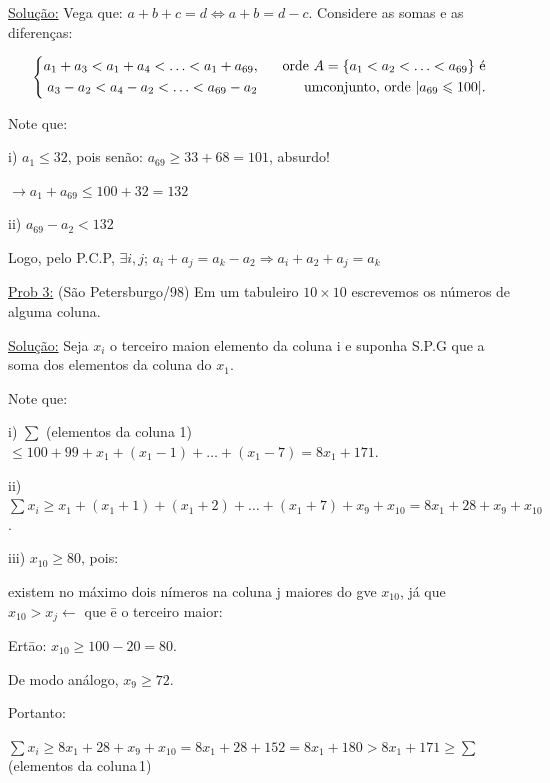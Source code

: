 \documentclass[a4paper,12pt]{article}
\renewcommand{\leq}{\ensuremath{\leqslant}}
\renewcommand{\geq}{\ensuremath{\geqslant}}
\theoremstyle{plain} %
\theoremstyle{definition} %
\theoremstyle{remark} %
\begin{document}
	\begin{framed}
		
		\underline{Solu\c{c}\~ao:} Vega que: $a+b+c=d \Leftrightarrow a+b=d-c$. Considere as somas e as diferen\c{c}as:
		
		\[
		\left\{
		\begin{aligned}
			a_1+a_3<a_1+a_4<\dotso<a_1+a_{69}, \text{\hspace{3ex} orde } A=\{a_1<a_2<\dotso<a_{69}\} \text{ \'e} \\
			a_3-a_2<a_4-a_2<\dotso<a_{69}-a_2 \text{\hspace{7ex} umconjunto, orde } |a_{69}\leq 100|.\\
		\end{aligned}
		\right.
		\]
		
		Note que:
		
		i) $a_1\leq 32$, pois sen\~ao: $a_{69}\geq 33+68=101$, absurdo!
		
		$\rightarrow a_1+a_{69}\leq 100+32=132$
		
		ii) $a_{69}-a_2<132$
		
		Logo, pelo P.C.P, $\exists i,j$; $a_i+a_j=a_k-a_2\Rightarrow a_i+a_2+a_j=a_k$ \tiny\textblock
		
	\end{framed}
	\normalsize
	
	\vspace{2ex}\underline{Prob 3:} (S\~ao Petersburgo/98) Em um tabuleiro $10\times 10$ escrevemos os n\'umeros de alguma coluna.
	
	\begin{framed}
		\underline{Solu\c{c}\~ao:} Seja $x_i$ o terceiro maion elemento da coluna i e suponha S.P.G que a soma dos elementos da coluna do $x_1$.
		
		Note que:
		
		i) $\sum$ (elementos da coluna 1)$\leq 100+99+x_1+(x_1-1)+\dotso+(x_1-7)=8x_1+171$.
		
		ii) $\sum x_i\geq x_1+(x_1+1)+(x_1+2)+\dotso+(x_1+7)+x_9+x_{10}=8x_1+28+x_9+x_{10}$.
		
		iii) $x_10\geq 80$, pois:
		
		existem no m\'aximo dois n\'imeros na coluna j maiores do gve $x_{10}$, j\'a que $x_{10}>x_j \leftarrow$ que \=e o terceiro maior:
		
		Ert\=ao: $x_{10}\geq 100-20=80$.
		
		De modo an\'alogo, $x_9\geq 72$.
		
		Portanto:
		
		$\sum x_i \geq 8x_1+28+x_9+x_{10}=8x_1+28+152=8x_1+180>8x_1+171\geq \sum$(elementos da coluna\,1) \tiny\textblock
	\end{framed}
	\normalsize
	
\end{document}
